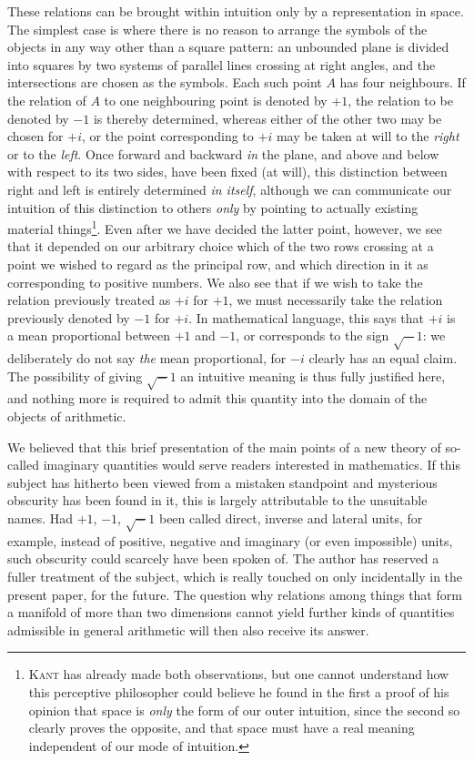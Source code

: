 These relations can be brought within intuition only by a representation
in space. The simplest case is where there is no reason to arrange the symbols of the objects in any way other than a square pattern: an unbounded plane is divided into squares by two systems of parallel lines crossing at right angles, and the intersections are chosen as the symbols. Each such point $A$ has four neighbours. If the relation of $A$ to one neighbouring point is denoted by $+1$, the relation to be denoted by $-1$ is thereby determined, whereas either of the other two may be chosen for $+i$, or the point corresponding to $+i$ may be taken at will to the \emph{right} or to the \emph{left}. Once forward and backward \emph{in} the plane, and above and below with respect to its two sides, have been fixed (at will), this distinction between right and left is entirely determined \emph{in itself}, although we can communicate our intuition of this distinction to others \emph{only} by pointing to actually existing material things\begingroup\renewcommand{\thefootnote}{*)}\footnote{\textsc{Kant} has already made both observations, but one cannot understand how this perceptive philosopher could believe he found in the first a proof of his opinion that space is \emph{only} the form of our outer intuition, since the second so clearly proves the opposite, and that space must have a real meaning independent of our mode of intuition.}\endgroup. Even after we have decided the latter point, however, we see that it depended on our arbitrary choice which of the two rows crossing at a point we wished to regard as the principal row, and which direction in it as corresponding to positive numbers. We also see that if we wish to take the relation previously treated as $+i$ for $+1$, we must necessarily take the relation previously denoted by $-1$ for $+i$. In mathematical language, this says that $+i$ is a mean proportional between $+1$ and $-1$, or corresponds to the sign $\surd-1$: we deliberately do not say \emph{the} mean proportional, for $-i$ clearly has an equal claim. The possibility of giving $\surd-1$ an intuitive meaning is thus fully justified here, and nothing more is required to admit this quantity into the domain of the objects of arithmetic.

We believed that this brief presentation of the main points of a new theory of so-called imaginary quantities would serve readers interested in mathematics. If this subject has hitherto been viewed from a mistaken standpoint and mysterious obscurity has been found in it,
this is largely attributable to the unsuitable names. Had $+1$, $-1$, $\surd-1$ been called direct, inverse and lateral units, for example, instead of positive, negative and imaginary (or even impossible) units, such obscurity could scarcely have been spoken of. The author has reserved a fuller treatment of the subject, which is really touched on only incidentally in the present paper, for the future. The question why relations among things that form a manifold of more than two dimensions cannot yield further kinds of quantities admissible in general arithmetic will then also receive its answer.


